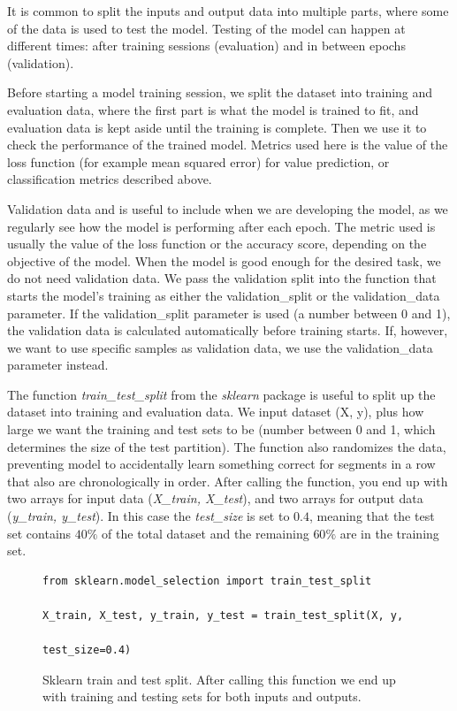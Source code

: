 It is common to split the inputs and output data into multiple parts, where some of the data is used to test the model. Testing of the model can happen at different times: after training sessions (evaluation) and in between epochs (validation). 

Before starting a model training session, we split the dataset into training and evaluation data, where the first part is what the model is trained to fit, and evaluation data is kept aside until the training is complete. Then we use it to check the performance of the trained model. Metrics used here is the value of the loss function (for example mean squared error) for value prediction, or classification metrics described above.

Validation data and is useful to include when we are developing the model, as we regularly see how the model is performing after each epoch. The metric used is usually the value of the loss function or the accuracy score, depending on the objective of the model. When the model is good enough for the desired task, we do not need validation data. We pass the validation split into the function that starts the model's training as either the validation\_split or the validation\_data parameter. If the validation\_split parameter is used (a number between 0 and 1), the validation data is calculated automatically before training starts. If, however, we want to use specific samples as validation data, we use the validation\_data parameter instead.

The function \textit{train\_test\_split} from the \textit{sklearn} package is useful to split up the dataset into training and evaluation data. We input dataset (X, y), plus how large we want the training and test sets to be (number between 0 and 1, which determines the size of the test partition). The function also randomizes the data, preventing model to accidentally learn something correct for segments in a row that also are chronologically in order. After calling the function, you end up with two arrays for input data (\textit{X\_train, X\_test}), and two arrays for output data (\textit{y\_train, y\_test}). In this case the \textit{test\_size} is set to $0.4$, meaning that the test set contains $40\%$ of the total dataset and the remaining $60\%$ are in the training set.

\begin{figure}[h]
\begin{code}
    \begin{verbatim}
from sklearn.model_selection import train_test_split

X_train, X_test, y_train, y_test = train_test_split(X, y, 
                                                    test_size=0.4)
    \end{verbatim}
    \caption{Sklearn train and test split. After calling this function we end up with training and testing sets for both inputs and outputs.}
    \label{code:sklearn_train_test_split}
\end{code}
\end{figure}

